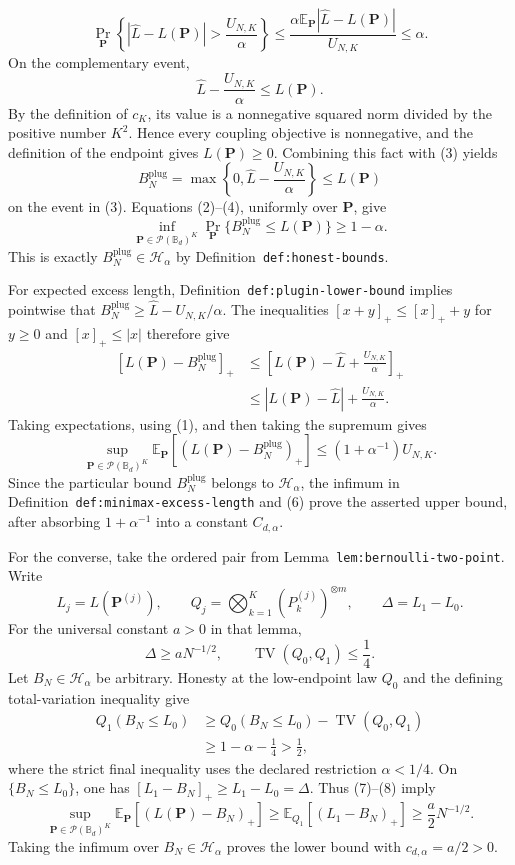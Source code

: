 \[
\Pr_{\mathbf P}\left\{|\widehat L-L(\mathbf P)|>
\frac{U_{N,K}}\alpha\right\}
\le\frac{\alpha\mathbb E_{\mathbf P}|\widehat L-L(\mathbf P)|}{U_{N,K}}
\le\alpha.
\tag{2}
\]
On the complementary event,
\[
\widehat L-\frac{U_{N,K}}\alpha\le L(\mathbf P).
\tag{3}
\]
By the definition of \(c_K\), its value is a nonnegative squared norm divided by the positive number \(K^2\).  Hence every coupling objective is nonnegative, and the definition of the endpoint gives \(L(\mathbf P)\ge0\).  Combining this fact with (3) yields
\[
B_N^{\mathrm{plug}}
=\max\left\{0,\widehat L-\frac{U_{N,K}}\alpha\right\}
\le L(\mathbf P)
\tag{4}
\]
on the event in (3).  Equations (2)--(4), uniformly over \(\mathbf P\), give
\[
\inf_{\mathbf P\in\mathcal P(\mathbb B_d)^K}
\Pr_{\mathbf P}\{B_N^{\mathrm{plug}}\le L(\mathbf P)\}
\ge1-\alpha.
\]
This is exactly \(B_N^{\mathrm{plug}}\in\mathcal H_\alpha\) by Definition~\texttt{def:honest-bounds}.

For expected excess length, Definition~\texttt{def:plugin-lower-bound} implies pointwise that \(B_N^{\mathrm{plug}}\ge\widehat L-U_{N,K}/\alpha\).  The inequalities \([x+y]_+\le[x]_++y\) for \(y\ge0\) and \([x]_+\le|x|\) therefore give
\[
\begin{aligned}
[L(\mathbf P)-B_N^{\mathrm{plug}}]_+
&\le\left[L(\mathbf P)-\widehat L+\frac{U_{N,K}}\alpha\right]_+\\
&\le|L(\mathbf P)-\widehat L|+\frac{U_{N,K}}\alpha.
\end{aligned}
\tag{5}
\]
Taking expectations, using (1), and then taking the supremum gives
\[
\sup_{\mathbf P\in\mathcal P(\mathbb B_d)^K}
\mathbb E_{\mathbf P}\!\left[(L(\mathbf P)-B_N^{\mathrm{plug}})_+\right]
\le(1+\alpha^{-1})U_{N,K}.
\tag{6}
\]
Since the particular bound \(B_N^{\mathrm{plug}}\) belongs to \(\mathcal H_\alpha\), the infimum in Definition~\texttt{def:minimax-excess-length} and (6) prove the asserted upper bound, after absorbing \(1+\alpha^{-1}\) into a constant \(C_{d,\alpha}\).

For the converse, take the ordered pair from Lemma~\texttt{lem:bernoulli-two-point}.  Write
\[
L_j=L(\mathbf P^{(j)}),
\qquad
Q_j=\bigotimes_{k=1}^K(P_k^{(j)})^{\otimes m},
\qquad
\Delta=L_1-L_0.
\]
For the universal constant \(a>0\) in that lemma,
\[
\Delta\ge aN^{-1/2},
\qquad
\operatorname{TV}(Q_0,Q_1)\le\frac14.
\tag{7}
\]
Let \(B_N\in\mathcal H_\alpha\) be arbitrary.  Honesty at the low-endpoint law \(Q_0\) and the defining total-variation inequality give
\[
\begin{aligned}
Q_1(B_N\le L_0)
&\ge Q_0(B_N\le L_0)-\operatorname{TV}(Q_0,Q_1)\\
&\ge1-\alpha-\frac14
>\frac12,
\end{aligned}
\tag{8}
\]
where the strict final inequality uses the declared restriction \(\alpha<1/4\).  On \(\{B_N\le L_0\}\), one has \([L_1-B_N]_+\ge L_1-L_0=\Delta\).  Thus (7)--(8) imply
\[
\sup_{\mathbf P\in\mathcal P(\mathbb B_d)^K}
\mathbb E_{\mathbf P}\!\left[(L(\mathbf P)-B_N)_+\right]
\ge\mathbb E_{Q_1}\!\left[(L_1-B_N)_+\right]
\ge\frac a2N^{-1/2}.
\tag{9}
\]
Taking the infimum over \(B_N\in\mathcal H_\alpha\) proves the lower bound with \(c_{d,\alpha}=a/2>0\).

